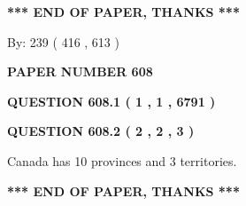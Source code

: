 \documentclass[12pt]{article}
\begin{document}
 
 
 
   
   
 \vspace{0.2in}
 
   
   
   
   
\vspace{1.0in} 
{\textbf{\large{ *** END OF PAPER, THANKS *** }}} 
   
   
\hspace{1.0in} By: 
 239 ( 416 ,  613 )
   
   
   
   
\newpage 
\setcounter{page}{ 
   608001 } 
   
   
   
   
 {\textbf{ \Large{ PAPER NUMBER  608  }}}
   
   
\vspace{0.2in}
   
   
   
   
   
   
 \vspace{0.2in}
 
 
 
 
   
   
  
\vspace{0.2in}
  
{\textbf{\Large{QUESTION
608.1 
 ( 1 , 1 , 6791 )
}}}
  
  
  
\vspace{0.2in}
  
{\textbf{\Large{QUESTION
608.2 
 ( 2 , 2 , 3 )
}}}
  
  
 
 
\noindent{}
 
 
Canada has 10  provinces and 3 territories.
 
 
 
 
   
   
 \vspace{0.2in}
 
   
   
   
   
\vspace{1.0in} 
{\textbf{\large{ *** END OF PAPER, THANKS *** }}} 
   
\end{document}
